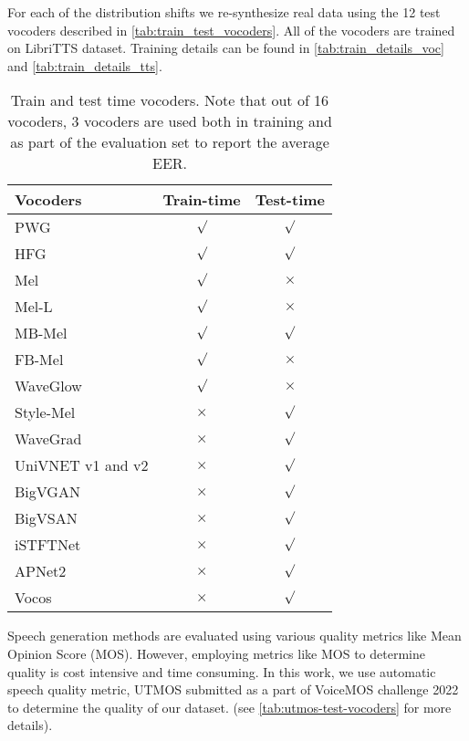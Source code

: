 For each of the distribution shifts we re-synthesize real data using the 12 test vocoders described in \autoref{tab:train_test_vocoders}. All of the vocoders are trained on LibriTTS dataset. Training details can be found in \autoref{tab:train_details_voc} and \autoref{tab:train_details_tts}.
\begin{table}[htbp!]
\caption{Train and test time vocoders. Note that out of 16 vocoders, 3 vocoders are used both in training and as part of the evaluation set to report the average EER.}
    \label{tab:train_test_vocoders}
    \scriptsize
    \vskip 0.15in
\begin{center}
\begin{small}
\begin{sc}
 \begin{tabular}{lcc}
    \toprule
Vocoders & Train-time & Test-time\\ 
    \midrule
PWG & $\surd$  & $\surd$  \\
\hline 
HFG & $\surd$  & $\surd$ \\ 
\hline 
Mel & $\surd$  & $\times$ \\ 
\hline 
Mel-L & $\surd$  & $\times$ \\ 
\hline 
MB-Mel & $\surd$  & $\surd$  \\  
\hline 
FB-Mel & $\surd$ & $\times$ \\ 
\hline 
WaveGlow & $\surd$  & $\times$ \\ 
\hline 
Style-Mel &$\times$ & $\surd$ \\ 
\hline
WaveGrad &$\times$ &$\surd$ \\ 
\hline 
UniVNET v1 and v2 &$\times$ &$\surd$  \\ 
\hline 
BigVGAN & $\times$ & $\surd$  \\ 
\hline 
BigVSAN &$\times$ & $\surd$  \\ 
\hline 
iSTFTNet &$\times$ &$\surd$  \\ 
\hline 
APNet2 & $\times$ &$\surd$  \\ 
\hline
Vocos & $\times$ &$\surd$  \\ 
     \bottomrule 
    \end{tabular}
    \end{sc}
\end{small}
\end{center}
\vskip -0.1in
\end{table}


Speech generation methods are evaluated using various quality metrics like Mean Opinion Score (MOS). However, employing metrics like MOS to determine quality is cost intensive and time consuming. In this work, we use automatic speech quality metric, UTMOS \cite{saeki2022utmosutokyosarulabvoicemoschallenge} submitted as a part of VoiceMOS challenge 2022 \cite{huang2022voicemoschallenge2022} to determine the quality of our dataset. (see \autoref{tab:utmos-test-vocoders} for more details).

